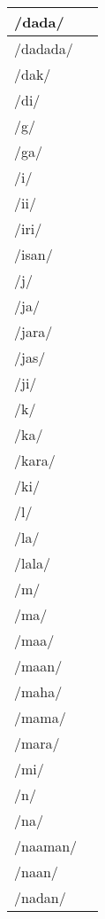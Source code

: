 \documentclass{article}
\begin{document}
\begin{longtable}{|l|p{}|}
/dada/ & \textIndus{} \\ \hline
/dadada/ & \textIndus{} \\ \hline
/dak/ & \textIndus{} \\ \hline
/di/ & \textIndus{} \\ \hline
/g/ & \textIndus{} \\ \hline
/ga/ & \textIndus{} \\ \hline
/i/ & \textIndus{} \\ \hline
/ii/ & \textIndus{} \\ \hline
/iri/ & \textIndus{} \\ \hline
/isan/ & \textIndus{} \\ \hline
/j/ & \textIndus{} \\ \hline
/ja/ & \textIndus{} \\ \hline
/jara/ & \textIndus{} \\ \hline
/jas/ & \textIndus{} \\ \hline
/ji/ & \textIndus{} \\ \hline
/k/ & \textIndus{} \\ \hline
/ka/ & \textIndus{} \\ \hline
/kara/ & \textIndus{} \\ \hline
/ki/ & \textIndus{} \\ \hline
/l/ & \textIndus{} \\ \hline
/la/ & \textIndus{} \\ \hline
/lala/ & \textIndus{} \\ \hline
/m/ & \textIndus{} \\ \hline
/ma/ & \textIndus{} \\ \hline
/maa/ & \textIndus{} \\ \hline
/maan/ & \textIndus{} \\ \hline
/maha/ & \textIndus{} \\ \hline
/mama/ & \textIndus{} \\ \hline
/mara/ & \textIndus{} \\ \hline
/mi/ & \textIndus{} \\ \hline
/n/ & \textIndus{} \\ \hline
/na/ & \textIndus{} \\ \hline
/naaman/ & \textIndus{} \\ \hline
/naan/ & \textIndus{} \\ \hline
/nadan/ & \textIndus{} \\ \hline

\end{longtable}
\end{document}
